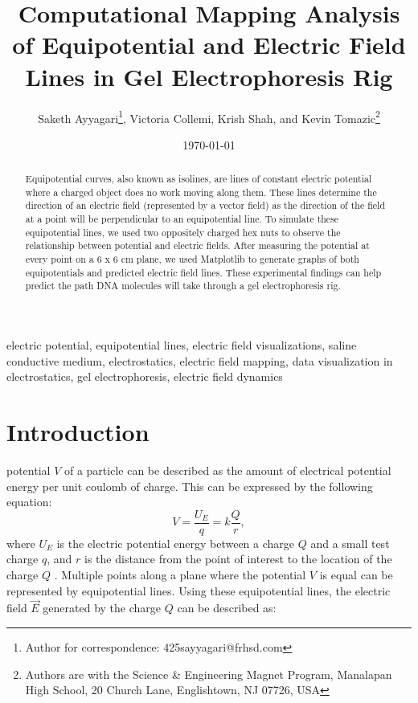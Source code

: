 \documentclass[10pt,journal,twoside]{IEEEtran}
\title{Computational Mapping Analysis of Equipotential and Electric Field Lines in Gel Electrophoresis Rig}
\author{Saketh Ayyagari\thanks{Author for correspondence: 425sayyagari@frhsd.com}, Victoria Collemi, Krish Shah, and Kevin Tomazic\thanks{Authors are with the Science \& Engineering Magnet Program, Manalapan High School, 20 Church Lane, Englishtown, NJ 07726, USA}}
\date{\today}
\newcommand{\keywords}{electric potential, equipotential lines, electric field visualizations, saline conductive medium, electrostatics, electric field mapping, data visualization in electrostatics, gel electrophoresis, electric field dynamics}
\begin{document}
\maketitle

\begin{abstract}
Equipotential curves, also known as isolines, are lines of constant electric potential where a charged object does no work moving along them. These lines determine the direction of an electric field (represented by a vector field) as the direction of the field at a point will be perpendicular to an equipotential line. To simulate these equipotential lines, we used two oppositely charged hex nuts to observe the relationship between potential and electric fields. After measuring the potential at every point on a 6 x 6 cm plane, we used Matplotlib to generate graphs of both equipotentials and predicted electric field lines. These experimental findings can help predict the path DNA molecules will take through a gel electrophoresis rig.
\end{abstract}

\begin{IEEEkeywords}
\keywords
\end{IEEEkeywords}

\section{Introduction}
 potential $V$ of a particle can be described as the amount of electrical potential energy per unit coulomb of charge. This can be expressed by the following equation:
\begin{equation}
V = \frac{U_E}{q} = k \frac{Q}{r},
\label{eq:1}
\end{equation}
where $U_E$ is the electric potential energy between a charge $Q$ and a small test charge $q$, and $r$ is the distance from the point of interest to the location of the charge $Q$ \cite{tipler}. Multiple points along a plane where the potential $V$ is equal can be represented by equipotential lines. Using these equipotential lines, the electric field $\vec{E}$ generated by the charge $Q$ can be described as:
\end{document}
